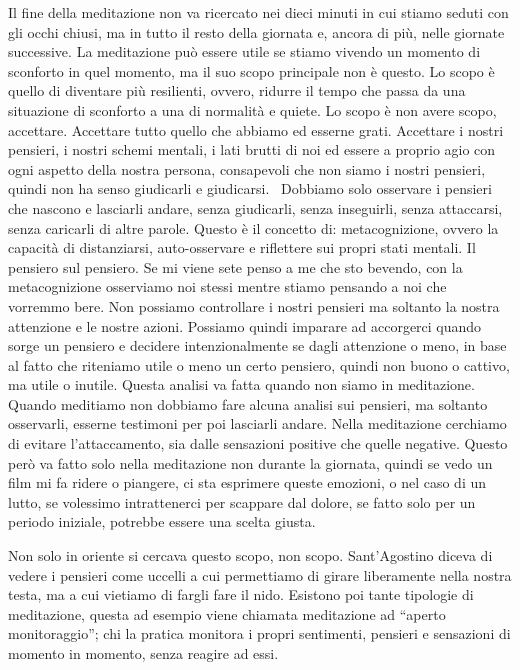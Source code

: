\documentclass[12pt]{book} %
\begin{document}
Il fine della meditazione non va ricercato nei dieci minuti in cui stiamo seduti con gli occhi chiusi, ma in tutto il
resto della giornata e, ancora di più, nelle giornate successive. La meditazione può essere utile se stiamo vivendo un
momento di sconforto in quel momento, ma il suo scopo principale non è questo. Lo scopo è quello di diventare più
resilienti, ovvero, ridurre il tempo che passa da una situazione di sconforto a una di normalità e quiete. Lo scopo è
non avere scopo, accettare. Accettare tutto quello che abbiamo ed esserne grati. Accettare i nostri pensieri, i nostri
schemi mentali, i lati brutti di noi ed essere a proprio agio con ogni aspetto della nostra persona, consapevoli che
non siamo i nostri pensieri, quindi non ha senso giudicarli e giudicarsi. \ Dobbiamo solo osservare i pensieri che
nascono e lasciarli andare, senza giudicarli, senza inseguirli, senza attaccarsi, senza caricarli di altre parole.
Questo è il concetto di: metacognizione, ovvero la capacità di distanziarsi, auto-osservare e riflettere sui propri
stati mentali. Il pensiero sul pensiero. Se mi viene sete penso a me che sto bevendo, con la metacognizione osserviamo
noi stessi mentre stiamo pensando a noi che vorremmo bere. Non possiamo controllare i nostri pensieri ma soltanto la
nostra attenzione e le nostre azioni. Possiamo quindi imparare ad accorgerci quando sorge un pensiero e decidere
intenzionalmente se dagli attenzione o meno, in base al fatto che riteniamo utile o meno un certo pensiero, quindi non
buono o cattivo, ma utile o inutile. Questa analisi va fatta quando non siamo in meditazione. Quando meditiamo non
dobbiamo fare alcuna analisi sui pensieri, ma soltanto osservarli, esserne testimoni per poi lasciarli andare.
Nella meditazione cerchiamo di evitare l'attaccamento, sia dalle sensazioni positive che quelle negative. Questo però va fatto solo nella meditazione non durante la giornata, quindi se vedo un film mi fa ridere o piangere, ci sta esprimere queste emozioni, o nel caso di un lutto, se volessimo intrattenerci per scappare dal dolore, se fatto solo per un periodo iniziale, potrebbe essere una scelta giusta.

Non solo in oriente si cercava questo scopo, non scopo. Sant'Agostino diceva di vedere i pensieri come uccelli a cui
permettiamo di girare liberamente nella nostra testa, ma a cui vietiamo di fargli fare il nido. Esistono poi tante
tipologie di meditazione, questa ad esempio viene chiamata meditazione ad “aperto monitoraggio”; chi la pratica
monitora i propri sentimenti, pensieri e sensazioni di momento in momento, senza reagire ad essi. 
\end{document}
